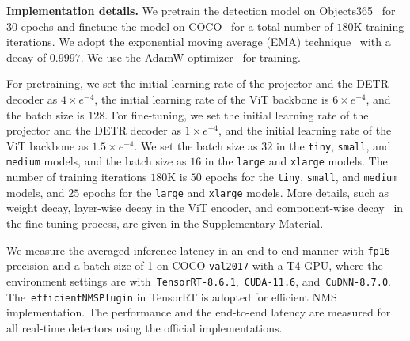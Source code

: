 \documentclass[runningheads]{llncs}
\begin{document}
\vspace{1mm}
\noindent\textbf{Implementation details.} We pretrain the detection model on Objects365~\cite{shao2019objects365} for $30$ epochs and finetune the model on COCO~\cite{lin2014microsoft} for a total number of $180$K training iterations. We adopt the exponential moving average (EMA) technique~\cite{tarvainen2017mean} with a decay of $0.9997$. We use the AdamW optimizer~\cite{loshchilov2017decoupled} for training.

For pretraining, we set the initial learning rate of the projector and the DETR decoder as $4\times e^{-4}$, the initial learning rate of the ViT backbone is $6\times e^{-4}$, and the batch size is $128$. For fine-tuning, we set the initial learning rate of the projector and the DETR decoder as $1\times e^{-4}$, and the initial learning rate of the ViT backbone as $1.5\times e^{-4}$. We set the batch size as $32$ in the \texttt{tiny}, \texttt{small}, and \texttt{medium} models, and the batch size as $16$ in the \texttt{large} and \texttt{xlarge} models. The number of training iterations $180$K is $50$ epochs for the \texttt{tiny}, \texttt{small}, and \texttt{medium} models, and $25$ epochs for the \texttt{large} and \texttt{xlarge} models. More details, such as weight decay, layer-wise decay in the ViT encoder, and component-wise decay~\cite{chen2022group} in the fine-tuning process, are given in the Supplementary Material. 

We measure the averaged inference latency in an end-to-end manner with \texttt{fp16} precision and a batch size of 1 on COCO \texttt{val2017} with a T4 GPU, where the environment settings are with~\texttt{TensorRT-8.6.1},~\texttt{CUDA-11.6}, and~\texttt{CuDNN-8.7.0}. The~\texttt{efficientNMSPlugin} in TensorRT is adopted for efficient NMS implementation. The performance and the end-to-end latency are measured for all real-time detectors using the official implementations.
\end{document}

